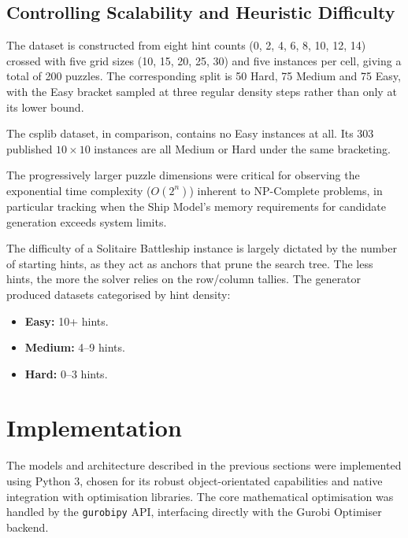 \subsection{Controlling Scalability and Heuristic Difficulty}\label{subsec:controlling-scalability-heuristic-diff}

The dataset is constructed from eight hint counts (0, 2, 4, 6, 8, 10, 12, 14) crossed with five grid sizes (10, 15, 20, 25, 30) and five instances per cell, giving a total of \num{200} puzzles. The corresponding split is 50 Hard, 75 Medium and 75 Easy, with the Easy bracket sampled at three regular density steps rather than only at its lower bound. 

The \gls{csplib} dataset, in comparison, contains no Easy instances at all. Its 303 published $10 \times 10$ instances are all Medium or Hard under the same bracketing. 

The progressively larger puzzle dimensions were critical for observing the exponential time complexity ($O(2^n)$) inherent to NP-Complete problems, in particular tracking when the Ship Model's memory requirements for candidate generation exceeds system limits.

The difficulty of a Solitaire Battleship instance is largely dictated by the number of starting hints, as they act as anchors that prune the search tree. The less hints, the more the solver relies on the row/column tallies. The generator produced datasets categorised by hint density:
\begin{itemize}
    \item \textbf{Easy:} 10+ hints.
    \item \textbf{Medium:} 4--9 hints.
    \item \textbf{Hard:} 0--3 hints.
\end{itemize}

\section{Implementation}\label{sec:impl}

The models and architecture described in the previous sections were implemented using Python 3, chosen for its robust object-orientated capabilities and native integration with optimisation libraries. The core mathematical optimisation was handled by the \verb|gurobipy| API, interfacing directly with the Gurobi Optimiser backend. 

